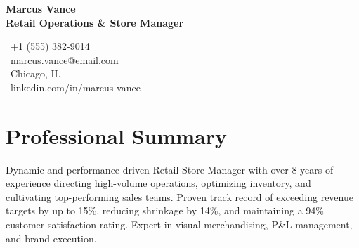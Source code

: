 \documentclass[10pt,letterpaper]{article}
\begin{document}
\noindent
\begin{minipage}[b]{0.65\textwidth}
    {\huge \bfseries \color{primary} Marcus Vance} \\[4pt]
    {\large \bfseries \color{secondary} Retail Operations \& Store Manager}
\end{minipage}%
\begin{minipage}[b]{0.35\textwidth}
    \raggedleft
    \small
    \color{secondary}
    \faPhone\ +1 (555) 382-9014 \\
    \faEnvelope\ marcus.vance@email.com \\
    \faMapMarker\ Chicago, IL \\
    \faLinkedin\ linkedin.com/in/marcus-vance
\end{minipage}

\vspace{8pt}

\section*{\faBriefcase\enskip Professional Summary}
Dynamic and performance-driven Retail Store Manager with over 8 years of experience directing high-volume operations, optimizing inventory, and cultivating top-performing sales teams. Proven track record of exceeding revenue targets by up to 15\%, reducing shrinkage by 14\%, and maintaining a 94\% customer satisfaction rating. Expert in visual merchandising, P\&L management, and brand execution.

\vspace{4pt}
\end{document}
